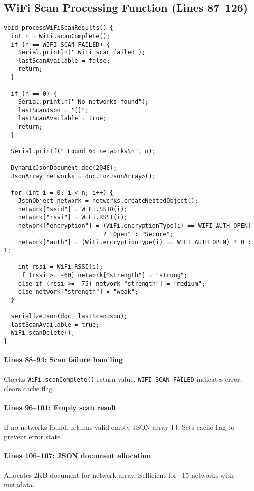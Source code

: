 \documentclass[11pt,a4paper]{article}
\begin{document}
\subsection{WiFi Scan Processing Function (Lines 87--126)}

\begin{verbatim}
void processWiFiScanResults() {
  int n = WiFi.scanComplete();
  if (n == WIFI_SCAN_FAILED) {
    Serial.println(" WiFi scan failed");
    lastScanAvailable = false;
    return;
  }
  
  if (n == 0) {
    Serial.println(" No networks found");
    lastScanJson = "[]";
    lastScanAvailable = true;
    return;
  }
  
  Serial.printf(" Found %d networks\n", n);
  
  DynamicJsonDocument doc(2048);
  JsonArray networks = doc.to<JsonArray>();
  
  for (int i = 0; i < n; i++) {
    JsonObject network = networks.createNestedObject();
    network["ssid"] = WiFi.SSID(i);
    network["rssi"] = WiFi.RSSI(i);
    network["encryption"] = (WiFi.encryptionType(i) == WIFI_AUTH_OPEN) 
                            ? "Open" : "Secure";
    network["auth"] = (WiFi.encryptionType(i) == WIFI_AUTH_OPEN) ? 0 : 1;
    
    int rssi = WiFi.RSSI(i);
    if (rssi >= -60) network["strength"] = "strong";
    else if (rssi >= -75) network["strength"] = "medium";
    else network["strength"] = "weak";
  }
  
  serializeJson(doc, lastScanJson);
  lastScanAvailable = true;
  WiFi.scanDelete();
}
\end{verbatim}

\paragraph{Lines 88--94: Scan failure handling}
Checks \texttt{WiFi.scanComplete()} return value. \texttt{WIFI\_SCAN\_FAILED} indicates error; clears cache flag.

\paragraph{Lines 96--101: Empty scan result}
If no networks found, returns valid empty JSON array \texttt{[]}. Sets cache flag to prevent error state.

\paragraph{Lines 106--107: JSON document allocation}
Allocates 2KB document for network array. Sufficient for ~15 networks with metadata.
\end{document}
